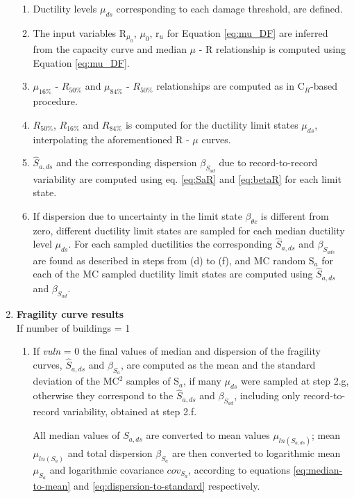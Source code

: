 \begin{enumerate}
\begin{enumerate}
\item Ductility levels $\mu_{ds}$ corresponding to each damage threshold, are defined.

\item The input variables R$_{\mu_{0}}$, $\mu_{0}$, r$_{u}$ for Equation \ref{eq:mu_DF} are inferred from the capacity curve and median $\mu$ - R relationship is computed using Equation \ref{eq:mu_DF}.

\item $\mu_{16\%}$ - $R_{50\%}$ and $\mu_{84\%}$ - $R_{50\%}$ relationships are computed as in C$_R$-based procedure.

\item $R_{50\%}$, $R_{16\%}$ and $R_{84\%}$ is computed for the ductility limit states $\mu_{ds}$, interpolating the aforementioned R - $\mu$ curves.

\item $\hat{S}_{a,ds}$ and the corresponding dispersion $\beta_{S_{a d}}$ due to record-to-record variability are computed using eq. \ref{eq:SaR} and \ref{eq:betaR} for each limit state.

\item If dispersion due to uncertainty in the limit state $\beta_{\theta c}$ is different from zero, different ductility limit states are sampled for each median ductility level $\mu_{ds}$. For each sampled ductilities the corresponding $\hat{S}_{a,ds}$ and $\beta_{S_{a ds}}$ are found as described in steps from (d) to (f), and MC random S$_a$ for each of the MC sampled ductility limit states are computed using $\hat{S}_{a,ds}$ and $\beta_{S_{a d}}$.\\

\end{enumerate}

\item \textbf{Fragility curve results}\\
If number of buildings = 1\\
\begin{enumerate}
\item If \textit{vuln} = 0
the final values of median and dispersion of the fragility curves, $\hat{S}_{a,ds}$ and $\beta_{S_a}$, are computed as the mean and the standard deviation of the MC$^2$ samples of S$_a$, if many $\mu_{ds}$ were sampled at step 2.g, otherwise they correspond to the $\hat{S}_{a,ds}$ and $\beta_{S_{a d}}$, including only record-to-record variability, obtained at step 2.f.

All median values of $S_{a, ds}$ are converted to mean values $\mu_{ln(S_{a, ds})}$; mean $\mu_{ln(S_{a})}$ and total dispersion $\beta_{S_a}$ are then converted to logarithmic mean $\mu_{S_a}$ and logarithmic covariance $cov_{S_a}$, according to equations \ref{eq:median-to-mean} and \ref{eq:dispersion-to-standard} respectively.


\end{enumerate}
\end{enumerate}

